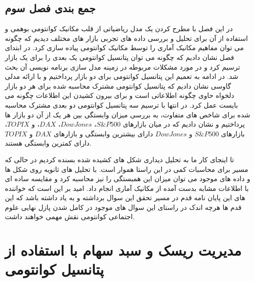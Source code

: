 \documentclass[a4paper,titlepage,12pt,fleqn,oneside]{report}
\begin{document}
	\section{جمع بندی فصل سوم}
	در این فصل با مطرح کردن یک مدل ریاضیاتی از قلب مکانیک کوانتومی بوهمی و استفاده از آن برای تحلیل و بررسی داده های تجربی بازار های مختلف دیدیم که چگونه می توان مفاهیم مکانیک آماری را توسط مکانیک کوانتومی پیاده سازی کرد. در ابتدای فصل نشان دادیم که چگونه می توان پتانسیل کوانتومی یک بعدی را برای یک بازار ترسیم کرد و در مورد مشکلات مربوطه در زمینه مدل سازی برنامه نویسی آن بحث شد. در ادامه به تعمیم این پتانسیل کوانتومی برای دو بازار پرداختیم و با ارائه مدلی گاوسی نشان دادیم که پتانسیل کوانتومی مشترک محاسبه شده برای هر دو بازار دلخواه حاوی چگونه اطلاعاتی است و برای بیرون کشیدن این اطلاعات چگونه می بایست عمل کرد. در انتها با ترسیم سه پتانسیل کوانتومی دو بعدی مشترک محاسبه شده برای شاخص های متفاوت، به بررسی میزان وابستگی بین هر یک از آن دو بازار ها پرداختیم و نشان دادیم که در میان بازارهای 
	$S\&P500$،
	$Dow Jones$،
	$DAX$،
	و
	$TOPIX$،
	بازارهای 
	$S\&P500$
	و 
	$Dow Jones$
	دارای بیشترین وابستگی  و بازارهای 
	$DAX$
	و
	$TOPIX$
	دارای کمترین وابستگی هستند. 
	
	
	تا اینجای کار ما به تحلیل دیداری شکل های کشیده شده بسنده کردیم در حالی که مسیر برای محاسبات کمی در این راستا هموار است. با تحلیل های ثانویه روی شکل ها و داده های موجود می توان میزان این همبستگی را نیز محاسبه کرد و مقایسه ساده ای با اطلاعات مشابه بدست آمده از مکانیک آماری انجام داد. امید بر این است که خواننده های این پایان نامه قدم در مسیر تحقق این سوال برداشته و به یاد داشته باشد که این قدم ها هرچه اندک در راستای این سوال های موجود در کامل شدن پازل نهایی علوم اجتماعی کوانتومی نقش مهمی خواهند داشت.
	
	\newpage
	\chapter{مدیریت ریسک و  سبد سهام با استفاده از پتانسیل کوانتومی}
\end{document}
